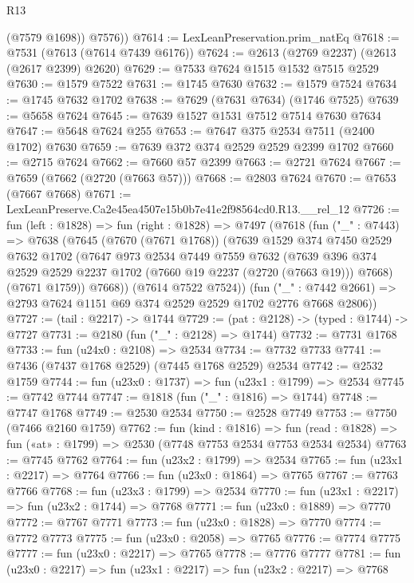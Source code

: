 \begin{lexlean}{R13}
\begin{coremodule}
          (@7579 @1698))
        @7576))
@7614 := LexLeanPreservation.prim_natEq
@7618 := @7531 (@7613 (@7614 @7439 @6176))
@7624 := @2613 (@2769 @2237) (@2613 (@2617 @2399) @2620)
@7629 := @7533 @7624 @1515 @1532 @7515 @2529
@7630 := @1579 @7522
@7631 := @1745 @7630
@7632 := @1579 @7524
@7634 := @1745 @7632 @1702
@7638 := @7629 (@7631 @7634) (@1746 @7525)
@7639 := @5658 @7624
@7645 := @7639 @1527 @1531 @7512 @7514 @7630 @7634
@7647 := @5648 @7624 @255
@7653 := @7647 @375 @2534 @7511 (@2400 @1702) @7630
@7659 := @7639 @372 @374 @2529 @2529 @2399 @1702
@7660 := @2715 @7624
@7662 := @7660 @57 @2399
@7663 := @2721 @7624
@7667 := @7659 (@7662 (@2720 (@7663 @57)))
@7668 := @2803 @7624
@7670 := @7653 (@7667 @7668)
@7671 := LexLeanPreserve.Ca2e45ea4507e15b0b7e41e2f98564cd0.R13.__rel_12
@7726 := fun (left : @1828) =>
  fun (right : @1828) =>
  @7497
    (@7618
      (fun ("_" : @7443) =>
      @7638
        (@7645
          (@7670 (@7671 @1768))
          (@7639
            @1529
            @374
            @7450
            @2529
            @7632
            @1702
            (@7647
              @973
              @2534
              @7449
              @7559
              @7632
              (@7639 @396 @374 @2529 @2529 @2237 @1702 (@7660 @19 @2237 (@2720 (@7663 @19))) @7668)
              (@7671 @1759))
            @7668))
        (@7614 @7522 @7524))
      (fun ("_" : @7442 @2661) => @2793 @7624 @1151 @69 @374 @2529 @2529 @1702 @2776 @7668 @2806))
@7727 := (tail : @2217) -> @1744
@7729 := (pat : @2128) -> (typed : @1744) -> @7727
@7731 := @2180 (fun ("_" : @2128) => @1744)
@7732 := @7731 @1768
@7733 := fun (u24x0 : @2108) => @2534
@7734 := @7732 @7733
@7741 := @7436 (@7437 @1768 @2529) (@7445 @1768 @2529) @2534
@7742 := @2532 @1759
@7744 := fun (u23x0 : @1737) => fun (u23x1 : @1799) => @2534
@7745 := @7742 @7744
@7747 := @1818 (fun ("_" : @1816) => @1744)
@7748 := @7747 @1768
@7749 := @2530 @2534
@7750 := @2528 @7749
@7753 := @7750 (@7466 @2160 @1759)
@7762 := fun (kind : @1816) =>
  fun (read : @1828) => fun («at» : @1799) => @2530 (@7748 @7753 @2534 @7753 @2534 @2534)
@7763 := @7745 @7762
@7764 := fun (u23x2 : @1799) => @2534
@7765 := fun (u23x1 : @2217) => @7764
@7766 := fun (u23x0 : @1864) => @7765
@7767 := @7763 @7766
@7768 := fun (u23x3 : @1799) => @2534
@7770 := fun (u23x1 : @2217) => fun (u23x2 : @1744) => @7768
@7771 := fun (u23x0 : @1889) => @7770
@7772 := @7767 @7771
@7773 := fun (u23x0 : @1828) => @7770
@7774 := @7772 @7773
@7775 := fun (u23x0 : @2058) => @7765
@7776 := @7774 @7775
@7777 := fun (u23x0 : @2217) => @7765
@7778 := @7776 @7777
@7781 := fun (u23x0 : @2217) => fun (u23x1 : @2217) => fun (u23x2 : @2217) => @7768

\end{coremodule}
\end{lexlean}
